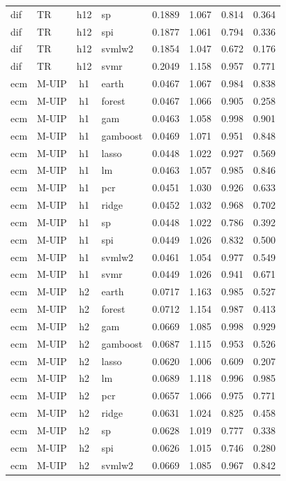 \begin{ThreePartTable}
\begin{longtable}[t]{llclcccc}
dif & TR & h12 & sp & 0.1889 & 1.067 & 0.814 & 0.364\\
dif & TR & h12 & spi & 0.1877 & 1.061 & 0.794 & 0.336\\
dif & TR & h12 & svmlw2 & 0.1854 & 1.047 & 0.672 & 0.176\\
dif & TR & h12 & svmr & 0.2049 & 1.158 & 0.957 & 0.771\\
\addlinespace
ecm & M-UIP & h1 & earth & 0.0467 & 1.067 & 0.984 & 0.838\\
ecm & M-UIP & h1 & forest & 0.0467 & 1.066 & 0.905 & 0.258\\
ecm & M-UIP & h1 & gam & 0.0463 & 1.058 & 0.998 & 0.901\\
ecm & M-UIP & h1 & gamboost & 0.0469 & 1.071 & 0.951 & 0.848\\
ecm & M-UIP & h1 & lasso & 0.0448 & 1.022 & 0.927 & 0.569\\
ecm & M-UIP & h1 & lm & 0.0463 & 1.057 & 0.985 & 0.846\\
ecm & M-UIP & h1 & pcr & 0.0451 & 1.030 & 0.926 & 0.633\\
ecm & M-UIP & h1 & ridge & 0.0452 & 1.032 & 0.968 & 0.702\\
ecm & M-UIP & h1 & sp & 0.0448 & 1.022 & 0.786 & 0.392\\
ecm & M-UIP & h1 & spi & 0.0449 & 1.026 & 0.832 & 0.500\\
ecm & M-UIP & h1 & svmlw2 & 0.0461 & 1.054 & 0.977 & 0.549\\
ecm & M-UIP & h1 & svmr & 0.0449 & 1.026 & 0.941 & 0.671\\
\addlinespace
ecm & M-UIP & h2 & earth & 0.0717 & 1.163 & 0.985 & 0.527\\
ecm & M-UIP & h2 & forest & 0.0712 & 1.154 & 0.987 & 0.413\\
ecm & M-UIP & h2 & gam & 0.0669 & 1.085 & 0.998 & 0.929\\
ecm & M-UIP & h2 & gamboost & 0.0687 & 1.115 & 0.953 & 0.526\\
ecm & M-UIP & h2 & lasso & 0.0620 & 1.006 & 0.609 & 0.207\\
ecm & M-UIP & h2 & lm & 0.0689 & 1.118 & 0.996 & 0.985\\
ecm & M-UIP & h2 & pcr & 0.0657 & 1.066 & 0.975 & 0.771\\
ecm & M-UIP & h2 & ridge & 0.0631 & 1.024 & 0.825 & 0.458\\
ecm & M-UIP & h2 & sp & 0.0628 & 1.019 & 0.777 & 0.338\\
ecm & M-UIP & h2 & spi & 0.0626 & 1.015 & 0.746 & 0.280\\
ecm & M-UIP & h2 & svmlw2 & 0.0669 & 1.085 & 0.967 & 0.842\\

\end{longtable}
\end{ThreePartTable}
